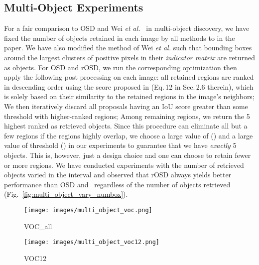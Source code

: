 \documentclass[runningheads]{llncs}
\begin{document}
\subsection{Multi-Object Experiments}
For a fair comparison to OSD and Wei {\em et al.}~\cite{Wei2019ddtplus} in multi-object discovery, we have fixed the number of objects retained in each image by all methods to  in the paper. We have also modified the method of Wei {\em et al.} such that  bounding boxes around the  largest clusters of positive pixels in their \textit{indicator matrix} are returned as objects. 
For OSD and rOSD, we run the corresponding optimization then apply the following post processing on each image: all  retained regions are ranked in descending order using the score proposed in \cite{Vo2019UnsupOptim} (Eq.\,12 in Sec.\,2.6 therein), which is solely based on their similarity to the retained regions in the image's neighbors; We then iteratively discard all proposals having an IoU score greater than some threshold with higher-ranked regions; Among remaining regions, we return the 5 highest ranked as retrieved objects. 
Since this procedure can eliminate all but a few regions if the regions highly overlap, we choose a large value of  () and a large value of  threshold () in our experiments to guarantee that we have \textit{exactly} 5 objects. 
This is, however, just a design choice and one can choose to retain fewer or more regions. We have conducted experiments with the number of retrieved objects varied in the interval  and observed that rOSD always yields better performance than OSD and~\cite{Wei2019ddtplus} regardless of the number of objects retrieved (Fig.~\ref{fig:multi_object_vary_numbox}).
\begin{figure*}
\centering
\begin{subfigure}{0.48\textwidth}
    \texttt{[image: images/multi\_object\_voc.png]}
    \caption{VOC\_all}
\end{subfigure}
\begin{subfigure}{0.48\textwidth}
    \texttt{[image: images/multi\_object\_voc12.png]}
    \caption{VOC12}
\end{subfigure}
\caption{\small Multi-object discovery performance of rOSD compared to OSD and~\cite{Wei2019ddtplus} when varying the maximum number of returned objects.}
\label{fig:multi_object_vary_numbox}
\end{figure*}
\end{document}
